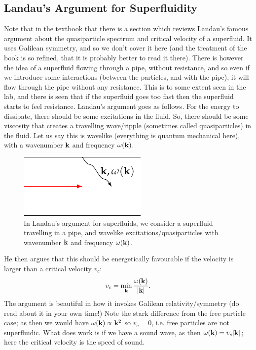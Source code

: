 \subsection{Landau's Argument for Superfluidity}
Note that in the textbook that there is a section which reviews Landau's famous argument about the quasiparticle spectrum and critical velocity of a superfluid. It uses Galilean symmetry, and so we don't cover it here (and the treatment of the book is so refined, that it is probably better to read it there). There is however the idea of a superfluid flowing through a pipe, without resistance, and so even if we introduce some interactions (between the particles, and with the pipe), it will flow through the pipe without any resistance. This is to some extent seen in the lab, and there is seen that if the superfluid goes too fast then the superfluid starts to feel resistance. Landau's argument goes as follows. For the energy to dissipate, there should be some excitations in the fluid. So, there should be some viscosity that creates a travelling wave/ripple (sometimes called quasiparticles) in the fluid. Let us say this is wavelike (everything is quantum mechanical here), with a wavenumber $\mathbf{k}$ and frequency $\omega(\mathbf{k})$. 

\begin{figure}[htbp]
    \centering
    \includegraphics[]{Images/fig-superfluidpipe.pdf}

    \caption{In Landau's argument for superfluids, we consider a superfluid travelling in a pipe, and wavelike excitations/quasiparticles with wavenumber $\mathbf{k}$ and frequency $\omega(\mathbf{k})$.}
    \label{fig-superfluidpipe}
\end{figure}


He then argues that this should be energetically favourable if the velocity is larger than a critical velocity $v_c$:
\begin{equation}
    v_c = \min_{\mathbf{k}} \frac{\omega(\mathbf{k})}{\lvert \mathbf{k} \rvert}.
\end{equation}
The argument is beautiful in how it invokes Galilean relativity/symmetry (do read about it in your own time!) Note the stark difference from the free particle case; as then we would have $\omega(\mathbf{k}) \propto \mathbf{k}^2$ so $v_c = 0$, i.e. free particles are not superfluidic. What does work is if we have a sound wave, as then $\omega(\mathbf{k}) = v_s\lvert \mathbf{k} \rvert$; here the critical velocity is the speed of sound.

